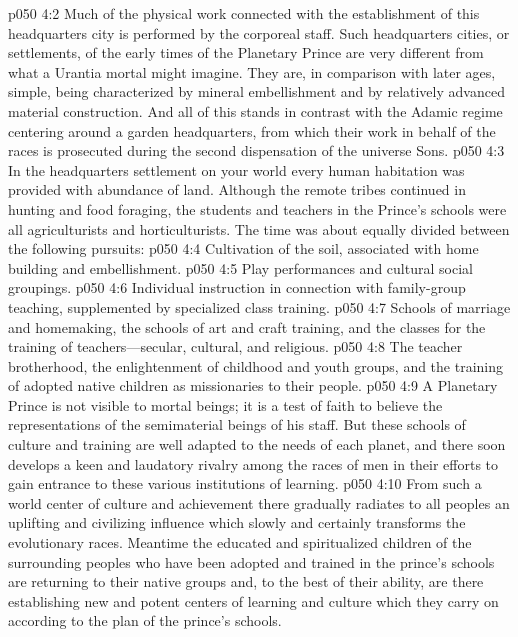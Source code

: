 \vs p050 4:2 Much of the physical work connected with the establishment of this headquarters city is performed by the corporeal staff. Such headquarters cities, or settlements, of the early times of the Planetary Prince are very different from what a Urantia mortal might imagine. They are, in comparison with later ages, simple, being characterized by mineral embellishment and by relatively advanced material construction. And all of this stands in contrast with the Adamic regime centering around a garden headquarters, from which their work in behalf of the races is prosecuted during the second dispensation of the universe Sons.
\pc \vs p050 4:3 In the headquarters settlement on your world every human habitation was provided with abundance of land. Although the remote tribes continued in hunting and food foraging, the students and teachers in the Prince’s schools were all agriculturists and horticulturists. The time was about equally divided between the following pursuits:
\pc \vs p050 4:4 \bibnobreakspace {} Cultivation of the soil, associated with home building and embellishment.
\vs p050 4:5 \bibnobreakspace {} Play performances and cultural social groupings.
\vs p050 4:6 \bibnobreakspace {} Individual instruction in connection with family\hyp{}group teaching, supplemented by specialized class training.
\vs p050 4:7 \bibnobreakspace {} Schools of marriage and homemaking, the schools of art and craft training, and the classes for the training of teachers---secular, cultural, and religious.
\vs p050 4:8 \bibnobreakspace {} The teacher brotherhood, the enlightenment of childhood and youth groups, and the training of adopted native children as missionaries to their people.
\pc \vs p050 4:9 A Planetary Prince is not visible to mortal beings; it is a test of faith to believe the representations of the semimaterial beings of his staff. But these schools of culture and training are well adapted to the needs of each planet, and there soon develops a keen and laudatory rivalry among the races of men in their efforts to gain entrance to these various institutions of learning.
\vs p050 4:10 From such a world center of culture and achievement there gradually radiates to all peoples an uplifting and civilizing influence which slowly and certainly transforms the evolutionary races. Meantime the educated and spiritualized children of the surrounding peoples who have been adopted and trained in the prince’s schools are returning to their native groups and, to the best of their ability, are there establishing new and potent centers of learning and culture which they carry on according to the plan of the prince’s schools.
